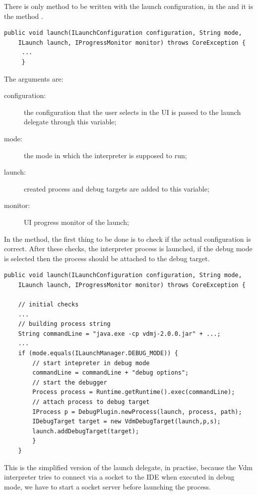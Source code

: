 There is only method to be written with the launch configuration, in the  and it is the  method .
\begin{lstlisting}
public void launch(ILaunchConfiguration configuration, String mode,
    ILaunch launch, IProgressMonitor monitor) throws CoreException {
	 ...
	 }
\end{lstlisting}

The arguments are:
\begin{description}
\item[configuration:]  the configuration that the user selects in the UI is passed to the launch delegate through this variable;

\item[mode:] the mode in which the interpreter is supposed to run;

\item[launch:] created process and debug targets are added to this variable;

\item[monitor:] UI progress monitor of the launch;
\end{description}

In the  method, the first thing to be done is to check if the actual configuration is correct. After these checks, the interpreter process is launched, if the debug mode is selected then the process should be attached to the debug target.

\begin{lstlisting}
public void launch(ILaunchConfiguration configuration, String mode,
	ILaunch launch, IProgressMonitor monitor) throws CoreException {
	
	// initial checks
	...
	// building process string
	String commandLine = "java.exe -cp vdmj-2.0.0.jar" + ...;
	...
	if (mode.equals(ILaunchManager.DEBUG_MODE)) {
		// start intepreter in debug mode
		commandLine = commandLine + "debug options";
		// start the debugger
		Process process = Runtime.getRuntime().exec(commandLine);
		// attach process to debug target
		IProcess p = DebugPlugin.newProcess(launch, process, path);
		IDebugTarget target = new VdmDebugTarget(launch,p,s);
		launch.addDebugTarget(target);
		}
	}
\end{lstlisting}
This is the simplified version of the launch delegate, in practise, because the Vdm interpreter tries to connect via a socket to the IDE when executed in debug mode, we have to start a socket server before launching the process.



